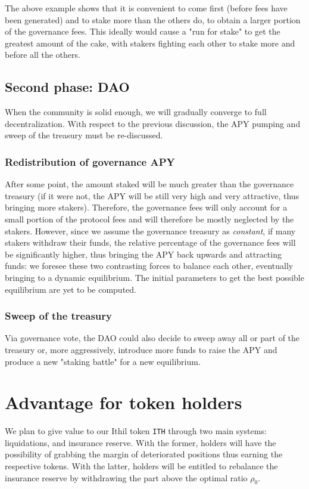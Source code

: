 \documentclass[a4paper,10 pt]{article}
\theoremstyle{definition}
\begin{document}
The above example shows that it is convenient to come first (before fees have been generated) and to stake more than the others do, to obtain a larger portion of the governance fees. This ideally would cause a "run for stake" to get the greatest amount of the cake, with stakers fighting each other to stake more and before all the others.

\subsection{Second phase: DAO}
When the community is solid enough, we will gradually converge to full decentralization. With respect to the previous discussion, the APY pumping and sweep of the treasury must be re-discussed.

\subsubsection{Redistribution of governance APY}
After some point, the amount staked will be much greater than the governance treasury (if it were not, the APY will be still very high and very attractive, thus bringing more stakers). Therefore, the governance fees will only account for a small portion of the protocol fees and will therefore be mostly neglected by the stakers. However, since we assume the governance treasury as {\it constant}, if many stakers withdraw their funds, the relative percentage of the governance fees will be significantly higher, thus bringing the APY back upwards and attracting funds: we foresee these two contrasting forces to balance each other, eventually bringing to a dynamic equilibrium. The initial parameters to get the best possible equilibrium are yet to be computed.

\subsubsection{Sweep of the treasury}
Via governance vote, the DAO could also decide to sweep away all or part of the treasury or, more aggressively, introduce more funds to raise the APY and produce a new "staking battle" for a new equilibrium.

\section{Advantage for token holders}

We plan to give value to our Ithil token \verb|ITH| through two main systems: liquidations, and insurance reserve. With the former, holders will have the possibility of grabbing the margin of deteriorated positions thus earning the respective tokens. With the latter, holders will be entitled to rebalance the insurance reserve by withdrawing the part above the optimal ratio $\rho_0$.
\end{document}
